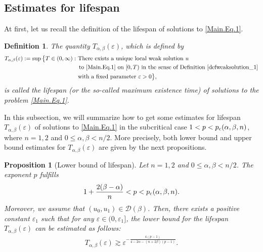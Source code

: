 \documentclass[11pt,reqno]{amsart}
\newtheorem{definition}{Definition}[section]
\newtheorem{proposition}{Proposition}[section]
\newcommand{\ity}{\infty}
\begin{document}
\subsection{Estimates for lifespan}
At first, let us recall the definition of the lifespan of solutions to \eqref{Main.Eq.1}.
\begin{definition}\label{Defn_Lifespan}
The quantity $T_{\alpha,\beta}(\varepsilon)$, which is defined by
\begin{align*}
T_{\alpha, \beta}(\varepsilon):= \sup \big\{T\in (0,\ity) : &\mbox{ There exists a unique local weak solution } u\notag \\
	&\,\,\, \mbox{to \eqref{Main.Eq.1} on } [0,T) \mbox{ in the sense of Definition \ref{defweaksolution_1}} \notag\\
    &\mbox{ with a fixed parameter }\varepsilon>0\big\},
\end{align*}
is called the lifespan (or the so-called maximum existence time) of solutions to the problem \eqref{Main.Eq.1}.
\end{definition}
In this subsection, we will summarize how to get some estimates for lifespan $T_{\alpha, \beta}(\varepsilon)$ of solutions to \eqref{Main.Eq.1} in the subcritical case $1< p< p_{\rm c}(\alpha,\beta,n)$, where $n = 1,2$ and $0 \leq \alpha, \beta < n/2$. More precisely, both lower bound and upper
bound estimates for $T_{\alpha,\beta}(\varepsilon)$ are given by the next propositions.

\begin{proposition}[Lower bound of lifespan]\label{Pro3.1}
Let $n=1,2$ and $0 \leq  \alpha, \beta < n/2$. The exponent $p$ fulfills
\begin{align}\label{condition3.1}
    1 + \frac{2(\beta-\alpha)}{n} < p < p_{\rm c}(\alpha,\beta,n).
\end{align}
Moreover, we assume that $(u_0, u_1) \in \mathcal{D}(\beta)$. Then, there exists a positive constant $\varepsilon_1$ such that for any $\varepsilon \in (0, \varepsilon_1]$,  the lower bound for the lifespan $T_{\alpha, \beta}(\varepsilon)$ can be estimated as follows: 
\begin{align}
    T_{\alpha, \beta}(\varepsilon) \gtrsim \varepsilon^{-\frac{4(p-1)}{4-2\alpha-(n+2\beta)(p-1)}}. \label{Es.Pro3.1}
\end{align}
\end{proposition}
\end{document}
